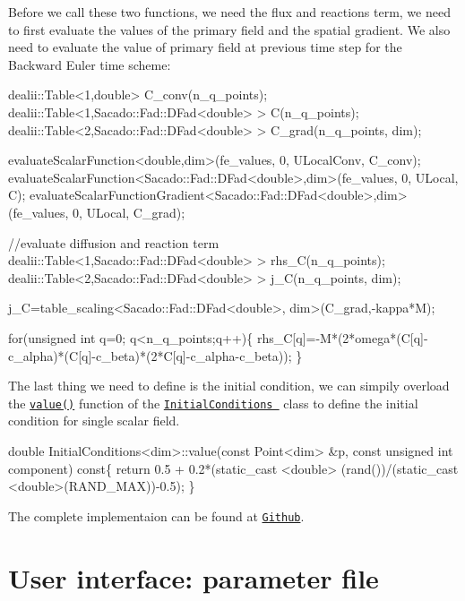 Before we call these two functions, we need the flux and reactions term, we need to first evaluate the values of the primary field and the spatial gradient. We also need to evaluate the value of primary field at previous time step for the Backward Euler time scheme\-: 
\begin{DoxyCode}
dealii::Table<1,double>  C\_conv(n\_q\_points);
dealii::Table<1,Sacado::Fad::DFad<double> >  C(n\_q\_points);
dealii::Table<2,Sacado::Fad::DFad<double> >  C\_grad(n\_q\_points, dim);

evaluateScalarFunction<double,dim>(fe\_values, 0, ULocalConv, C\_conv);
evaluateScalarFunction<Sacado::Fad::DFad<double>,dim>(fe\_values, 0, ULocal, C); 
evaluateScalarFunctionGradient<Sacado::Fad::DFad<double>,dim>(fe\_values, 0, ULocal, C\_grad);

\textcolor{comment}{//evaluate diffusion and reaction term}
dealii::Table<1,Sacado::Fad::DFad<double> > rhs\_C(n\_q\_points);
dealii::Table<2,Sacado::Fad::DFad<double> > j\_C(n\_q\_points, dim);

j\_C=table\_scaling<Sacado::Fad::DFad<double>, dim>(C\_grad,-kappa*M);

\textcolor{keywordflow}{for}(\textcolor{keywordtype}{unsigned} \textcolor{keywordtype}{int} q=0; q<n\_q\_points;q++)\{
     rhs\_C[q]=-M*(2*omega*(C[q]-c\_alpha)*(C[q]-c\_beta)*(2*C[q]-c\_alpha-c\_beta));
 \}
\end{DoxyCode}
 The last thing we need to define is the initial condition, we can simpily overload the \href{../html/class_initial_conditions.html#a369cea7ba74f8cd0a6ca12e0c164ff74}{\tt value()} function of the \href{../html/class_initial_conditions.html}{\tt Initial\-Conditions } class to define the initial condition for single scalar field. 
\begin{DoxyCode}
\textcolor{keywordtype}{double} InitialConditions<dim>::value(\textcolor{keyword}{const} Point<dim>   &p, \textcolor{keyword}{const} \textcolor{keywordtype}{unsigned} \textcolor{keywordtype}{int}  component)\textcolor{keyword}{ const}\{
  \textcolor{keywordflow}{return} 0.5 + 0.2*(static\_cast <\textcolor{keywordtype}{double}> (rand())/(static\_cast <double>(RAND\_MAX))-0.5); 
\}
\end{DoxyCode}


The complete implementaion can be found at \href{https://github.com/mechanoChem/mechanoChemFEM/tree/example/Example3_Allen-Cahn}{\tt Github}.\hypertarget{growth_file}{}\section{User interface\-: parameter file}\label{growth_file}

